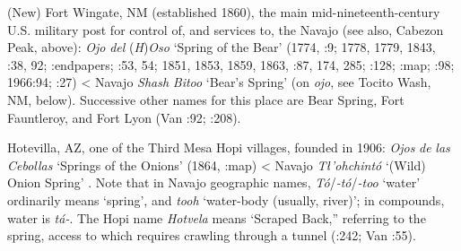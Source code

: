 (New) Fort Wingate, NM (established 1860), the main mid-nineteenth-century U.S. military post for control of, and services to, the Navajo (see also, Cabezon Peak, above):  \textit{Ojo} \textit{del} (\textit{H})\textit{Oso} ‘Spring of the Bear’ (1774, \citealt{Brugge1980}:9; 1778, 1779, 1843, \citealt{Kessell2013}:38, 92; \citealt{McNitt1972}:endpapers; \citealt{Eidenbach2012}:53, 54; 1851, 1853, 1859, 1863, \citealt{Correll1979}:87, 174, 285; \citealt{Foreman1941}:128; \citealt{Sitgreaves1962}:map; \citealt{Bailey1964a}:98; 1966:94; \citealt{Kelly1970}:27) < Navajo \textit{Shash} \textit{Bitoo} ‘Bear's Spring’ (on \textit{ojo}, see Tocito Wash, NM, below).  Successive other names for this place are Bear Spring, Fort Fauntleroy, and Fort Lyon (Van \citealt{ValkenburghWalker1945}:92; \citealt{Linford2000}:208).

Hotevilla, AZ, one of the Third Mesa Hopi villages, founded in 1906:  \textit{Ojos} \textit{de} \textit{las} \textit{Cebollas} ‘Springs of the Onions’ (1864, \citealt{Madsen2010}:map) < Navajo \textit{Tł’ohchintó} ‘(Wild) Onion Spring’ \citep[339]{Haile1950}.  Note that in Navajo geographic names, \textit{Tó}/\textit{{}-tó}/\textit{{}-too} ‘water’ ordinarily means ‘spring’, and \textit{tooh} ‘water-body (usually, river)’; in compounds, water is \textit{tá-}.  The Hopi name \textit{Hotvela} means ‘Scraped Back,” referring to the spring, access to which requires crawling through a tunnel (\citealt{Gregory1916}:242; Van \citealt{Valkenburgh1999}:55).

